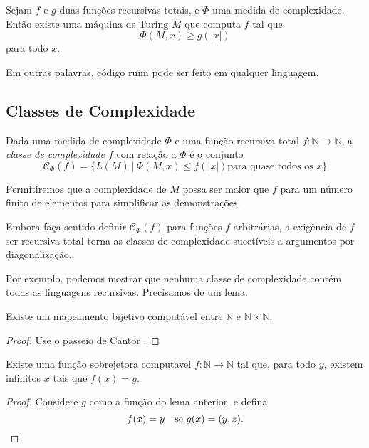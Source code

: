 \begin{theorem}
    Sejam $f$ e $g$ duas funções recursivas totais,
    e $\Phi$ uma medida de complexidade.
    Então existe uma máquina de Turing $M$ que computa $f$
    tal que
    \begin{equation*}
        \Phi(M, x) \geq g(|x|)
    \end{equation*}
    para todo $x$.
\end{theorem}

Em outras palavras,
código ruim pode ser feito em qualquer linguagem.

\subsection{Classes de Complexidade}

\begin{definition}
    Dada uma medida de complexidade $\Phi$
    e uma função recursiva total
    $f: \mathbb N \rightarrow \mathbb N$,
    a \emph{classe de complexidade $f$} com relação a $\Phi$
    é o conjunto
    \begin{equation*}
        \mathcal C_\Phi(f) = \{ L(M) \ | \ \Phi(M, x) \leq f(|x|)
            \text{para quase todos os $x$}
        \}
    \end{equation*}
\end{definition}
Permitiremos que a complexidade de $M$
possa ser maior que $f$ para um número finito de elementos
para simplificar as demonstrações.

Embora faça sentido definir $\mathcal C_\Phi(f)$
para funções $f$ arbitrárias,
a exigência de $f$ ser recursiva total
torna as classes de complexidade
sucetíveis a argumentos por diagonalização.

Por exemplo,
podemos mostrar que
nenhuma classe de complexidade contém todas as linguagens recursivas.
Precisamos de um lema.

\begin{lemma}
    Existe um mapeamento bijetivo computável
    entre $\mathbb N$ e $\mathbb N \times \mathbb N$.
\end{lemma}

\begin{proof}
    Use o passeio de Cantor
    \cite[p. 6]{CarnielliConiglioBianconi2006}.
\end{proof}

\begin{lemma}
    Existe uma função sobrejetora computavel
    $f: \mathbb N \rightarrow \mathbb N$
    tal que,
    para todo $y$,
    existem infinitos $x$ tais que $f(x) = y$.
\end{lemma}
\begin{proof}
    Considere $g$ como a função do lema anterior,
    e defina
    \begin{equation*}
        f(x) = y \quad \text{se $g(x) = (y, z)$.} \qedhere
    \end{equation*}
\end{proof}

